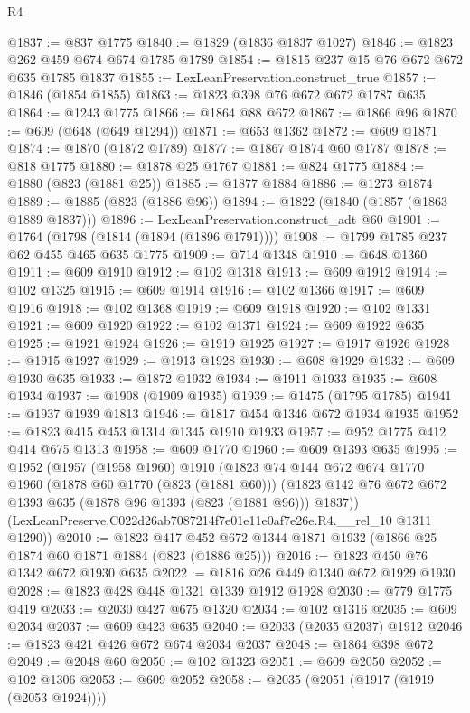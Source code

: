 \begin{lexlean}{R4}
\begin{coremodule}
@1837 := @837 @1775
@1840 := @1829 (@1836 @1837 @1027)
@1846 := @1823 @262 @459 @674 @674 @1785 @1789
@1854 := @1815 @237 @15 @76 @672 @672 @635 @1785 @1837
@1855 := LexLeanPreservation.construct_true
@1857 := @1846 (@1854 @1855)
@1863 := @1823 @398 @76 @672 @672 @1787 @635
@1864 := @1243 @1775
@1866 := @1864 @88 @672
@1867 := @1866 @96
@1870 := @609 (@648 (@649 @1294))
@1871 := @653 @1362
@1872 := @609 @1871
@1874 := @1870 (@1872 @1789)
@1877 := @1867 @1874 @60 @1787
@1878 := @818 @1775
@1880 := @1878 @25 @1767
@1881 := @824 @1775
@1884 := @1880 (@823 (@1881 @25))
@1885 := @1877 @1884
@1886 := @1273 @1874
@1889 := @1885 (@823 (@1886 @96))
@1894 := @1822 (@1840 (@1857 (@1863 @1889 @1837)))
@1896 := LexLeanPreservation.construct_adt @60
@1901 := @1764 (@1798 (@1814 (@1894 (@1896 @1791))))
@1908 := @1799 @1785 @237 @62 @455 @465 @635 @1775
@1909 := @714 @1348
@1910 := @648 @1360
@1911 := @609 @1910
@1912 := @102 @1318
@1913 := @609 @1912
@1914 := @102 @1325
@1915 := @609 @1914
@1916 := @102 @1366
@1917 := @609 @1916
@1918 := @102 @1368
@1919 := @609 @1918
@1920 := @102 @1331
@1921 := @609 @1920
@1922 := @102 @1371
@1924 := @609 @1922 @635
@1925 := @1921 @1924
@1926 := @1919 @1925
@1927 := @1917 @1926
@1928 := @1915 @1927
@1929 := @1913 @1928
@1930 := @608 @1929
@1932 := @609 @1930 @635
@1933 := @1872 @1932
@1934 := @1911 @1933
@1935 := @608 @1934
@1937 := @1908 (@1909 @1935)
@1939 := @1475 (@1795 @1785)
@1941 := @1937 @1939 @1813
@1946 := @1817 @454 @1346 @672 @1934 @1935
@1952 := @1823 @415 @453 @1314 @1345 @1910 @1933
@1957 := @952 @1775 @412 @414 @675 @1313
@1958 := @609 @1770
@1960 := @609 @1393 @635
@1995 := @1952
    (@1957
      (@1958 @1960)
      @1910
      (@1823
        @74
        @144
        @672
        @674
        @1770
        @1960
        (@1878 @60 @1770 (@823 (@1881 @60)))
        (@1823 @142 @76 @672 @672 @1393 @635 (@1878 @96 @1393 (@823 (@1881 @96))) @1837))
      (LexLeanPreserve.C022d26ab7087214f7e01e11e0af7e26e.R4.__rel_10 @1311 @1290))
@2010 := @1823 @417 @452 @672 @1344 @1871 @1932 (@1866 @25 @1874 @60 @1871 @1884 (@823 (@1886 @25)))
@2016 := @1823 @450 @76 @1342 @672 @1930 @635
@2022 := @1816 @26 @449 @1340 @672 @1929 @1930
@2028 := @1823 @428 @448 @1321 @1339 @1912 @1928
@2030 := @779 @1775 @419
@2033 := @2030 @427 @675 @1320
@2034 := @102 @1316
@2035 := @609 @2034
@2037 := @609 @423 @635
@2040 := @2033 (@2035 @2037) @1912
@2046 := @1823 @421 @426 @672 @674 @2034 @2037
@2048 := @1864 @398 @672
@2049 := @2048 @60
@2050 := @102 @1323
@2051 := @609 @2050
@2052 := @102 @1306
@2053 := @609 @2052
@2058 := @2035 (@2051 (@1917 (@1919 (@2053 @1924))))

\end{coremodule}
\end{lexlean}
